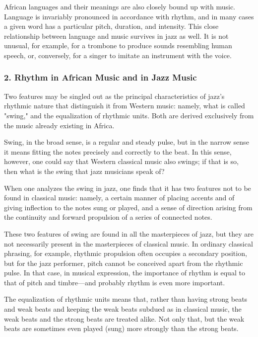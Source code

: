 African languages and their meanings are also closely bound up with music. Language is invariably pronounced in accordance with rhythm, and in many cases a given word has a particular pitch, duration, and intensity. This close relationship between language and music survives in jazz as well. It is not unusual, for example, for a trombone to produce sounds resembling human speech, or, conversely, for a singer to imitate an instrument with the voice.

\subsubsection{2. Rhythm in African Music and in Jazz Music}

Two features may be singled out as the principal characteristics of jazz's rhythmic nature that distinguish it from Western music: namely, what is called "swing," and the equalization of rhythmic units. Both are derived exclusively from the music already existing in Africa.

Swing, in the broad sense, is a regular and steady pulse, but in the narrow sense it means fitting the notes precisely and correctly to the beat. In this sense, however, one could say that Western classical music also swings; if that is so, then what is the swing that jazz musicians speak of?

When one analyzes the swing in jazz, one finds that it has two features not to be found in classical music: namely, a certain manner of placing accents and of giving inflection to the notes sung or played, and a sense of direction arising from the continuity and forward propulsion of a series of connected notes.

These two features of swing are found in all the masterpieces of jazz, but they are not necessarily present in the masterpieces of classical music. In ordinary classical phrasing, for example, rhythmic propulsion often occupies a secondary position, but for the jazz performer, pitch cannot be conceived apart from the rhythmic pulse. In that case, in musical expression, the importance of rhythm is equal to that of pitch and timbre—and probably rhythm is even more important.

The equalization of rhythmic units means that, rather than having strong beats and weak beats and keeping the weak beats subdued as in classical music, the weak beats and the strong beats are treated alike. Not only that, but the weak beats are sometimes even played (sung) more strongly than the strong beats.

